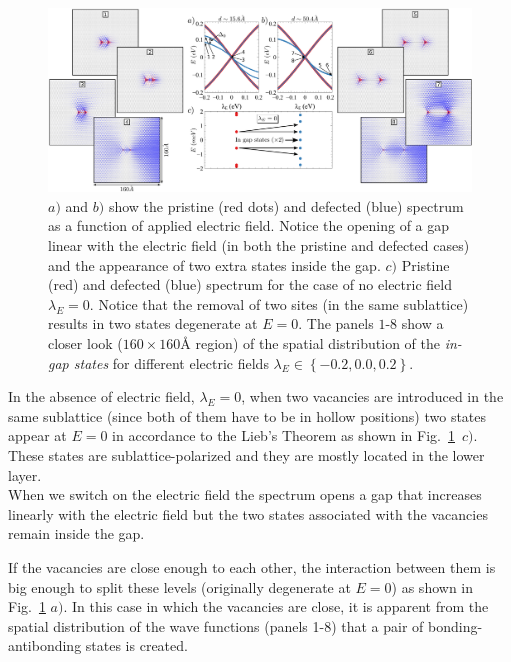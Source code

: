 \begin{figure}[h!]
\centering
\includegraphics[width=\textwidth]{chapter06/figures/double_vac_spectrum.pdf}
\vspace{-5pt}
\caption{$a)$ and $b)$ show the pristine (red dots) and defected (blue) spectrum as a function of applied electric field. Notice the opening of a gap linear with the electric field (in both the pristine and defected cases) and the appearance of two extra states inside the gap. $c)$ Pristine (red) and defected (blue) spectrum for the case of no electric field $\lambda_E=0$. Notice that the removal of two sites (in the same sublattice) results in two states degenerate at $E=0$. The panels $1$-$8$ show a closer look ($160\times160\text{\AA}$ region) of the spatial distribution of the \emph{in-gap states} for different electric fields $\lambda_E\in\left\{-0.2,0.0,0.2\right\}$.}
\label{2vac_spec}
\end{figure}
\FloatBarrier

In the absence of electric field, $\lambda_E = 0$, when two vacancies are introduced in the same sublattice (since both of them have to be in hollow positions) two states appear at $E=0$ in accordance to the Lieb's Theorem as shown in Fig.~\ref{2vac_spec}~$c)$. These states are sublattice-polarized and they are mostly located in the lower layer.\\

When we switch on the electric field the spectrum opens a gap that increases linearly with the electric field but the two states associated with the vacancies remain inside the gap.

If the vacancies are close enough to each other, the interaction between them is big enough to split these levels (originally degenerate at $E=0$) as shown in Fig.~\ref{2vac_spec} $a)$. In this case in which the vacancies are close, it is apparent from the spatial distribution of the wave functions (panels 1-8) that a pair of bonding-antibonding states is created.

